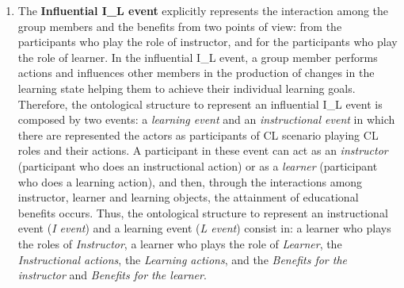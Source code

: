 \begin{enumerate} [label=(\alph*)]
\item
The \textbf{Influential I\_L event} explicitly represents the interaction among the group members and the benefits from two points of view: from the participants who play the role of instructor, and for the participants who play the role of learner. In the influential I\_L event, a group member performs actions and influences other members in the production of changes in the learning state helping them to achieve their individual learning goals. Therefore, the ontological structure to represent an influential I\_L event is composed by two events: a \emph{learning event} and an \emph{instructional event} in which there are represented the actors as participants of CL scenario playing CL roles and their actions. A participant in these event can act as an \emph{instructor} (participant who does an instructional action) or as a \emph{learner} (participant who does a learning action), and then, through the interactions among instructor, learner and learning objects, the attainment of educational benefits occurs. Thus, the ontological structure to represent an instructional event (\emph{I event}) and a learning event (\emph{L event}) consist in: a learner who plays the roles of \emph{Instructor}, a learner who plays the role of \emph{Learner}, the \emph{Instructional actions}, the \emph{Learning actions}, and the \emph{Benefits for the instructor} and \emph{Benefits for the learner}.
\end{enumerate}

